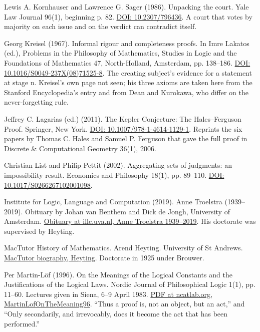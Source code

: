 \documentclass[11pt,twoside]{article}
\theoremstyle{thielethm}
\theoremstyle{thieledef}
\theoremstyle{thieledef}
\theoremstyle{thieledef}
\theoremstyle{thielethm}
\theoremstyle{thieleobs}
\theoremstyle{thielethm}
\begin{document}
\noindent Lewis A. Kornhauser and Lawrence G. Sager (1986). Unpacking the court. Yale Law Journal 96(1), beginning p. 82. \href{https://doi.org/10.2307/796436}{DOI: 10.2307/796436}. A court that votes by majority on each issue and on the verdict can contradict itself.
\par\medskip

\noindent Georg Kreisel (1967). Informal rigour and completeness proofs. In Imre Lakatos (ed.), Problems in the Philosophy of Mathematics, Studies in Logic and the Foundations of Mathematics 47, North-Holland, Amsterdam, pp. 138--186. \href{https://doi.org/10.1016/S0049-237X(08)71525-8}{DOI: 10.1016/S0049-237X(08)71525-8}. The creating subject's evidence for a statement at stage n. Kreisel's own page not seen; his three axioms are taken here from the Stanford Encyclopedia's entry and from Dean and Kurokawa, who differ on the never-forgetting rule.
\par\medskip

\noindent Jeffrey C. Lagarias (ed.) (2011). The Kepler Conjecture: The Hales--Ferguson Proof. Springer, New York. \href{https://doi.org/10.1007/978-1-4614-1129-1}{DOI: 10.1007/978-1-4614-1129-1}. Reprints the six papers by Thomas C. Hales and Samuel P. Ferguson that gave the full proof in Discrete \& Computational Geometry 36(1), 2006.
\par\medskip

\noindent Christian List and Philip Pettit (2002). Aggregating sets of judgments: an impossibility result. Economics and Philosophy 18(1), pp. 89--110. \href{https://doi.org/10.1017/S0266267102001098}{DOI: 10.1017/S0266267102001098}.
\par\medskip

\noindent Institute for Logic, Language and Computation (2019). Anne Troelstra (1939--2019). Obituary by Johan van Benthem and Dick de Jongh, University of Amsterdam. \href{https://www.illc.uva.nl/NewsandEvents/News/Obituaries/Anne-Troelstra-1939-2019-/}{Obituary at illc.uva.nl, Anne Troelstra 1939--2019}. His doctorate was supervised by Heyting.
\par\medskip

\noindent MacTutor History of Mathematics. Arend Heyting. University of St Andrews. \href{https://mathshistory.st-andrews.ac.uk/Biographies/Heyting/}{MacTutor biography, Heyting}. Doctorate in 1925 under Brouwer.
\par\medskip

\noindent Per Martin-L\"of (1996). On the Meanings of the Logical Constants and the Justifications of the Logical Laws. Nordic Journal of Philosophical Logic 1(1), pp. 11--60. Lectures given in Siena, 6--9 April 1983. \href{https://ncatlab.org/nlab/files/MartinLofOnTheMeaning96.pdf}{PDF at ncatlab.org, MartinLofOnTheMeaning96}. ``Thus a proof is, not an object, but an act,'' and ``Only secondarily, and irrevocably, does it become the act that has been performed.''
\par\medskip
\end{document}
